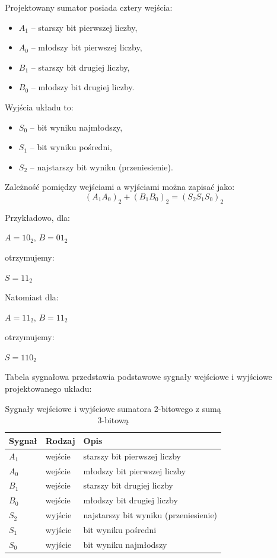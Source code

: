 \documentclass[11pt]{article}
\begin{document}
Projektowany sumator posiada cztery wejścia:
\begin{itemize}
    \item \(A_1\) -- starszy bit pierwszej liczby,
    \item \(A_0\) -- młodszy bit pierwszej liczby,
    \item \(B_1\) -- starszy bit drugiej liczby,
    \item \(B_0\) -- młodszy bit drugiej liczby.
\end{itemize}

Wyjścia układu to:
\begin{itemize}
    \item \(S_0\) -- bit wyniku najmłodszy,
    \item \(S_1\) -- bit wyniku pośredni,
    \item \(S_2\) -- najstarszy bit wyniku (przeniesienie).
\end{itemize}

Zależność pomiędzy wejściami a wyjściami można zapisać jako:
\begin{equation}
(A_1 A_0)_2 + (B_1 B_0)_2 = (S_2 S_1 S_0)_2
\end{equation}

Przykładowo, dla:
\begin{center}
$A = 10_2$, $B = 01_2$
\end{center}
otrzymujemy:
\begin{center}
$S = 11_2$
\end{center}

Natomiast dla:
\begin{center}
$A = 11_2$, $B = 11_2$
\end{center}
otrzymujemy:
\begin{center}
$S = 110_2$
\end{center}

Tabela sygnałowa przedstawia podstawowe sygnały wejściowe i wyjściowe projektowanego układu:
\begin{table}[h]
\centering
\caption{Sygnały wejściowe i wyjściowe sumatora 2-bitowego z sumą 3-bitową}
\begin{tabular}{lll}
\toprule
Sygnał & Rodzaj & Opis \\
\midrule
\(A_1\) & wejście & starszy bit pierwszej liczby \\
\(A_0\) & wejście & młodszy bit pierwszej liczby \\
\(B_1\) & wejście & starszy bit drugiej liczby \\
\(B_0\) & wejście & młodszy bit drugiej liczby \\
\(S_2\) & wyjście & najstarszy bit wyniku (przeniesienie) \\
\(S_1\) & wyjście & bit wyniku pośredni \\
\(S_0\) & wyjście & bit wyniku najmłodszy \\
\bottomrule
\end{tabular}
\end{table}
\end{document}
